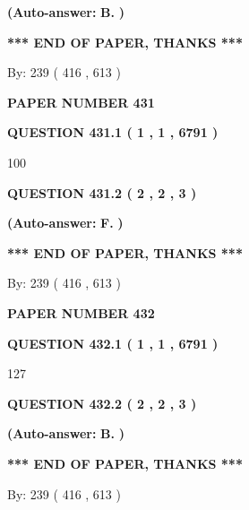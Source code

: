\documentclass{ctexart}
\begin{document}
 
{\textbf{(Auto-answer:}}
{\textbf{\large{
B.}}}
{\textbf{)}}
 
 
   
   
   
   
\vspace{1.0in} 
{\textbf{\large{ *** END OF PAPER, THANKS *** }}} 
   
   
\hspace{1.0in} By: 
 239 ( 416 ,  613 )
   
   
   
   
\newpage 
\setcounter{page}{ 
   431001 } 
   
   
 {\textbf{ \Large{ PAPER NUMBER  431  }}}
   
   
   
   
  
  
{\textbf{\large{QUESTION
431.1 
 ( 1 , 1 , 6791 )
}}}

100
  
  
{\textbf{\large{QUESTION
431.2 
 ( 2 , 2 , 3 )
}}}
 
 
{\textbf{(Auto-answer:}}
{\textbf{\large{
F.}}}
{\textbf{)}}
 
 
   
   
   
   
\vspace{1.0in} 
{\textbf{\large{ *** END OF PAPER, THANKS *** }}} 
   
   
\hspace{1.0in} By: 
 239 ( 416 ,  613 )
   
   
   
   
\newpage 
\setcounter{page}{ 
   432001 } 
   
   
 {\textbf{ \Large{ PAPER NUMBER  432  }}}
   
   
   
   
  
  
{\textbf{\large{QUESTION
432.1 
 ( 1 , 1 , 6791 )
}}}

127
  
  
{\textbf{\large{QUESTION
432.2 
 ( 2 , 2 , 3 )
}}}
 
 
{\textbf{(Auto-answer:}}
{\textbf{\large{
B.}}}
{\textbf{)}}
 
 
   
   
   
   
\vspace{1.0in} 
{\textbf{\large{ *** END OF PAPER, THANKS *** }}} 
   
   
\hspace{1.0in} By: 
 239 ( 416 ,  613 )
   
   
   
\end{document}
